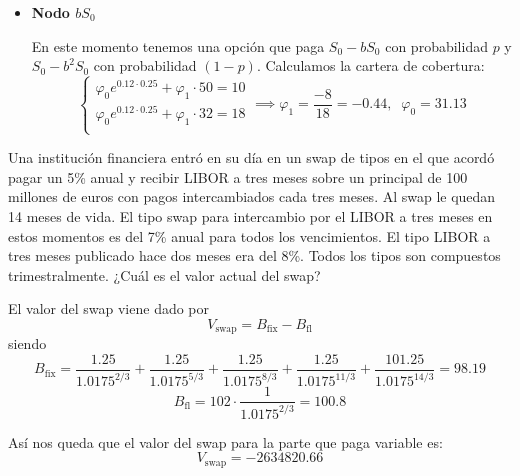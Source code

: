 \begin{problem}[2]
\begin{itemize}
\item \textbf{Nodo $bS_0$}

En este momento tenemos una opción que paga $S_0-bS_0$ con probabilidad $p$ y $S_0-b^2S_0$ con probabilidad $(1-p)$. Calculamos la cartera de cobertura:
\[\left\{\begin{array}{l}
\varphi_0 e^{0.12\cdot 0.25}+\varphi_1 \cdot 50 = 10 \\
\varphi_0 e^{0.12\cdot 0.25}+\varphi_1 \cdot 32 = 18 \\
\end{array}\right. \implies \varphi_1 = \frac{-8}{18} = -0.44, \;\; \varphi_0 = 31.13\]

\end{itemize}

\end{problem}

\begin{problem}[3]
Una institución financiera entró en su día en un swap de tipos en el que acordó pagar un 5\% anual y recibir LIBOR a tres meses sobre un principal de 100 millones de euros con pagos intercambiados cada tres meses. Al swap le quedan 14 meses de vida. El tipo swap para intercambio por el LIBOR a tres meses en estos momentos es del 7\% anual para todos los vencimientos. El tipo LIBOR a tres meses publicado hace dos meses era del 8\%. Todos los tipos son compuestos trimestralmente. ¿Cuál es el valor actual del swap?

\solution
{}

El valor del swap viene dado por
\[V_{\text{swap}} = B_{\text{fix}}- B_{\text{fl}}\]
siendo
\[B_{\text{fix}} =\frac{1.25}{1.0175^{2/3}} + \frac{1.25}{1.0175^{5/3}} +\frac{1.25}{1.0175^{8/3}}  + \frac{1.25}{1.0175^{11/3}} + \frac{101.25}{1.0175^{14/3}} = 98.19\]
\[B_{\text{fl}} = 102 \cdot \frac{1}{1.0175^{2/3}} = 100.8\]

Así nos queda que el valor del swap para la parte que paga variable es:
\[V_{\text{swap}} = -2634820.66\]
\end{problem}

